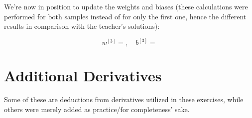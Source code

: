 \documentclass[12pt]{article}
\begin{document}
\begin{enumerate}[leftmargin=\labelsep]
  We're now in position to update the weights and biases (these calculations were performed
  for both samples instead of for only the first one, hence the different results
  in comparison with the teacher's solutions):

  \begin{equation*}
    w^{[3]} = , \quad
    b^{[3]} = 
  \end{equation*}

\end{enumerate}

\pagebreak

\section*{Additional Derivatives}

Some of these are deductions from derivatives utilized in these exercises, while
others were merely added as practice/for completeness' sake.
\end{document}

